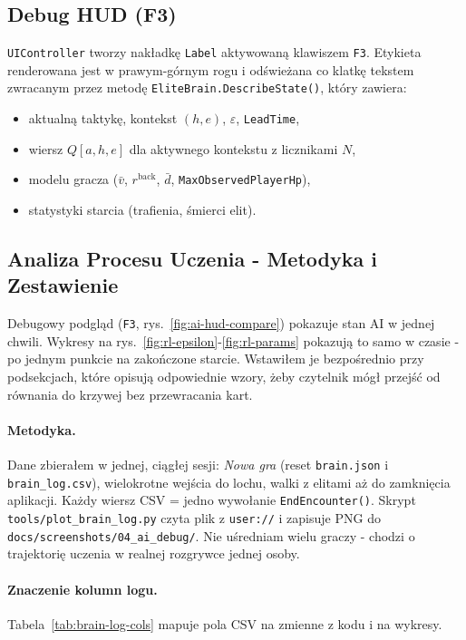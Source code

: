 \subsection{Debug HUD (F3)}

\texttt{UIController} tworzy nakładkę \texttt{Label} aktywowaną klawiszem \texttt{F3}. Etykieta renderowana jest w prawym-górnym rogu i odświeżana co klatkę tekstem zwracanym przez metodę \texttt{EliteBrain.\allowbreak DescribeState()}, który zawiera:

\begin{itemize}
    \item aktualną taktykę, kontekst $(h,e)$, $\varepsilon$, \texttt{LeadTime},
    \item wiersz $Q[a, h, e]$ dla aktywnego kontekstu z licznikami $N$,
    \item modelu gracza ($\bar v$, $r^\text{back}$, $\bar d$, \texttt{MaxObservedPlayerHp}),
    \item statystyki starcia (trafienia, śmierci elit).
\end{itemize}

\subsection{Analiza Procesu Uczenia - Metodyka i Zestawienie}
\label{sec:rl-analiza}

Debugowy podgląd (\texttt{F3}, rys.~\ref{fig:ai-hud-compare}) pokazuje stan AI w jednej chwili. Wykresy na rys.~\ref{fig:rl-epsilon}-\ref{fig:rl-params} pokazują to samo w czasie - po jednym punkcie na zakończone starcie. Wstawiłem je bezpośrednio przy podsekcjach, które opisują odpowiednie wzory, żeby czytelnik mógł przejść od równania do krzywej bez przewracania kart.

\paragraph{Metodyka.} Dane zbierałem w jednej, ciągłej sesji: \textit{Nowa gra} (reset \texttt{brain.json} i \texttt{brain\_log.csv}), wielokrotne wejścia do lochu, walki z elitami aż do zamknięcia aplikacji. Każdy wiersz CSV = jedno wywołanie \texttt{EndEncounter()}. Skrypt \texttt{tools/plot\_brain\_log.py} czyta plik z \texttt{user://} i zapisuje PNG do \texttt{docs/screenshots/04\_ai\_debug/}. Nie uśredniam wielu graczy - chodzi o trajektorię uczenia w realnej rozgrywce jednej osoby.

\paragraph{Znaczenie kolumn logu.} Tabela~\ref{tab:brain-log-cols} mapuje pola CSV na zmienne z kodu i na wykresy.

